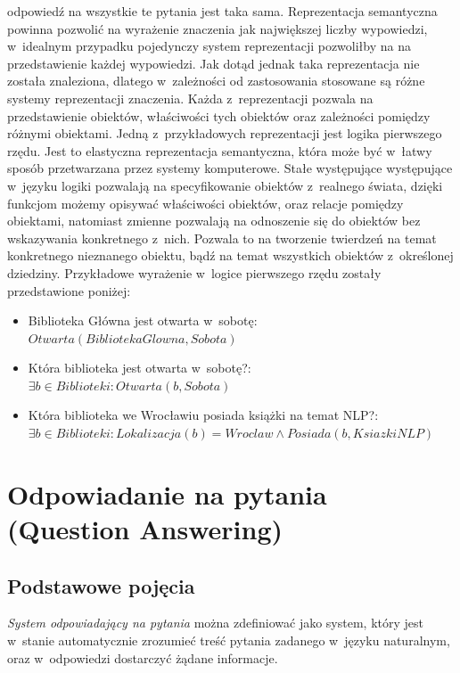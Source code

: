 \documentclass[a4paper, twoside, openright, 12pt]{report}
\begin{document}
                odpowiedź na wszystkie te pytania jest taka sama. Reprezentacja semantyczna powinna pozwolić na wyrażenie
                znaczenia jak największej liczby wypowiedzi, w~idealnym przypadku pojedynczy system reprezentacji pozwoliłby
                na na przedstawienie każdej wypowiedzi. Jak dotąd jednak taka reprezentacja nie została znaleziona, dlatego
                w~zależności od zastosowania stosowane są różne systemy reprezentacji znaczenia. Każda z~reprezentacji
                pozwala na przedstawienie obiektów, właściwości tych obiektów oraz zależności pomiędzy różnymi obiektami.
                Jedną z~przykładowych reprezentacji jest logika pierwszego rzędu\cite{SEMANTICPARSING}. Jest to elastyczna reprezentacja semantyczna,
                która może być w~łatwy sposób przetwarzana przez systemy komputerowe. Stałe występujące występujące w~języku
                logiki pozwalają na specyfikowanie obiektów z~realnego świata, dzięki funkcjom możemy opisywać właściwości
                obiektów, oraz relacje pomiędzy obiektami, natomiast zmienne pozwalają na odnoszenie się do obiektów bez wskazywania
                konkretnego z~nich. Pozwala to na tworzenie twierdzeń na temat konkretnego nieznanego obiektu, bądź na temat
                wszystkich obiektów z~określonej dziedziny. Przykładowe wyrażenie w~logice pierwszego rzędu zostały przedstawione
                poniżej:
                \begin{itemize}
                    \item Biblioteka Główna jest otwarta w~sobotę: $ Otwarta(BibliotekaGlowna, Sobota) $
                    \item Która biblioteka jest otwarta w~sobotę?: $ \exists b \in Biblioteki: Otwarta(b, Sobota) $
                    \item Która biblioteka we Wrocławiu posiada książki na temat NLP?: \\ $ \exists b \in Biblioteki: Lokalizacja(b) = Wroclaw \land Posiada(b, KsiazkiNLP) $
                \end {itemize}


    \section{Odpowiadanie na pytania (Question Answering)}
        \subsection{Podstawowe pojęcia}
            \emph{System odpowiadający na pytania} można zdefiniować jako system, który jest w~stanie automatycznie
            zrozumieć treść pytania zadanego w~języku naturalnym, oraz w~odpowiedzi dostarczyć żądane informacje\cite{HANDBOOKNLP}.
\end{document}
